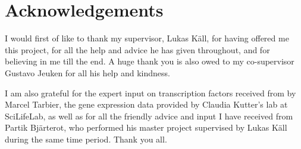 \chapter{Acknowledgements}
\vspace{-0.75cm}
I would first of like to thank my supervisor, Lukas Käll, for having offered me this project, for all the help and advice he has given throughout, and for believing in me till the end. A huge thank you is also owed to my co-supervisor Gustavo Jeuken for all his help and kindness. 

I am also grateful for the expert input on transcription factors received from by Marcel Tarbier, the gene expression data provided by Claudia Kutter's lab at SciLifeLab, as well as for all the friendly advice and input I have received from Partik Bjärterot, who performed his master project supervised by Lukas Käll during the same time period. Thank you all.
